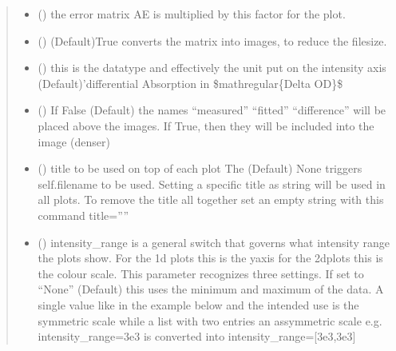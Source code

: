 \documentclass[letterpaper,10pt,english]{sphinxmanual}
\begin{document}
\begin{fulllineitems}
\begin{quote}
\begin{description}
\begin{itemize}
\item {} 
 (\sphinxstyleliteralemphasis{\sphinxupquote{, }}) \textendash{} the error matrix AE is multiplied by this factor for the plot.

\item {} 
 () \textendash{} (Default)True converts the matrix into images, to reduce the filesize.

\item {} 
 () \textendash{} this is the datatype and effectively the unit put on the intensity axis
(Default)’differential Absorption in \$mathregular\{Delta OD\}\$

\item {} 
 (\sphinxstyleliteralemphasis{\sphinxupquote{, }}) \textendash{} If False (Default) the names “measured” “fitted” “difference” will be placed above the images.
If True, then they will be included into the image (denser)

\item {} 
 () \textendash{} title to be used on top of each plot
The (Default) None triggers  self.filename to be used. Setting a specific title as string will
be used in all plots. To remove the title all together set an empty string with this command title=””

\item {} 
 (\sphinxstyleliteralemphasis{\sphinxupquote{, }}\sphinxstyleliteralemphasis{\sphinxupquote{ {[}}}\sphinxstyleliteralemphasis{\sphinxupquote{{]}}}) \textendash{} intensity\_range is a general switch that governs what intensity range the plots show.
For the 1d plots this is the y\sphinxhyphen{}axis for the 2d\sphinxhyphen{}plots this is the colour scale.
This parameter recognizes three settings. If set to “None” (Default) this uses the minimum and
maximum of the data. A single value like in the example below and the intended use is the symmetric
scale while a list with two entries an assymmetric scale e.g.
intensity\_range=3e\sphinxhyphen{}3 is converted into intensity\_range={[}\sphinxhyphen{}3e\sphinxhyphen{}3,3e\sphinxhyphen{}3{]}


\end{itemize}
\end{description}
\end{quote}
\end{fulllineitems}
\end{document}
